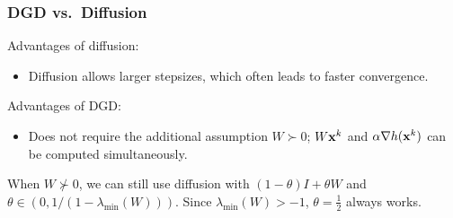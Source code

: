 \documentclass[10pt,mathserif]{beamer}
\begin{document}
\begin{frame}
\frametitle{DGD vs.\ Diffusion}
Advantages of diffusion:
\begin{itemize}
\item
Diffusion allows larger stepsizes, which often leads to faster convergence.

\end{itemize}

\vspace{0.2in}
Advantages of DGD:
\begin{itemize}
\item
Does not require the additional assumption $W\succ 0$; $W{\mathbf{x}}^k$ and $\alpha \nabla h({\mathbf{x}}^k)$ can be computed simultaneously.
\end{itemize}

\vspace{0.2in}

When $W\nsucc 0$, we can still use diffusion with $(1-\theta) I+\theta W$ and $\theta\in(0,1/(1-\lambda_\mathrm{min}(W)))$. Since $\lambda_\mathrm{min}(W)>-1$, $\theta=\frac{1}{2}$ always works.
\end{frame}



\end{document}
